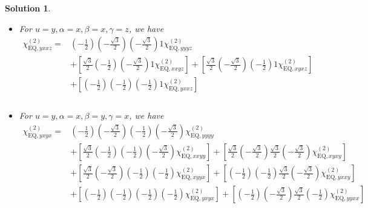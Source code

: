 \documentclass[UTF8,10pt,a4paper]{article}
\theoremstyle{Problem}
\theoremstyle{Solution}
\newtheorem*{sol}{Solution}
\begin{document}
\begin{sol}
\begin{itemize}
\begin{align}
\nonumber&+\left[\left(-\frac{1}{2}\right)\left(-\frac{1}{2}\right)\left(-\frac{\sqrt{3}}{2}\right)\frac{\sqrt{3}}{2}\chi_{\text{EQ},yxyx}^{(2)}\right]+\left[\left(-\frac{1}{2}\right)\left(-\frac{\sqrt{3}}{2}\right)\left(-\frac{1}{2}\right)\frac{\sqrt{3}}{2}\chi_{\text{EQ},yyxx}^{(2)}\right]\\
&+\left[\frac{\sqrt{3}}{2}\left(-\frac{1}{2}\right)\left(-\frac{1}{2}\right)\frac{\sqrt{3}}{2}\chi_{\text{EQ},xxxx}^{(2)}\right]
\end{align}\normalsize
\item For $u=y,\alpha=x,\beta=x,\gamma=z$, we have
\footnotesize\begin{align}
\nonumber\chi_{\text{EQ},yxxz}^{(2)}=&\left(-\frac{1}{2}\right)\left(-\frac{\sqrt{3}}{2}\right)\left(-\frac{\sqrt{3}}{2}\right)1\chi_{\text{EQ},yyyz}^{(2)}\\
\nonumber&+\left[\frac{\sqrt{3}}{2}\left(-\frac{1}{2}\right)\left(-\frac{\sqrt{3}}{2}\right)1\chi_{\text{EQ},xxyz}^{(2)}\right]+\left[\frac{\sqrt{3}}{2}\left(-\frac{\sqrt{3}}{2}\right)\left(-\frac{1}{2}\right)1\chi_{\text{EQ},xyxz}^{(2)}\right]\\
\nonumber&+\left[\left(-\frac{1}{2}\right)\left(-\frac{1}{2}\right)\left(-\frac{1}{2}\right)1\chi_{\text{EQ},yxxz}^{(2)}\right]\\
\nonumber&\\
&
\end{align}\normalsize
\item For $u=y,\alpha=x,\beta=y,\gamma=x$, we have
\footnotesize\begin{align}
\nonumber\chi_{\text{EQ},yxyx}^{(2)}=&\left(-\frac{1}{2}\right)\left(-\frac{\sqrt{3}}{2}\right)\left(-\frac{1}{2}\right)\left(-\frac{\sqrt{3}}{2}\right)\chi_{\text{EQ},yyyy}^{(2)}\\
\nonumber&+\left[\frac{\sqrt{3}}{2}\left(-\frac{1}{2}\right)\left(-\frac{1}{2}\right)\left(-\frac{\sqrt{3}}{2}\right)\chi_{\text{EQ},xxyy}^{(2)}\right]+\left[\frac{\sqrt{3}}{2}\left(-\frac{\sqrt{3}}{2}\right)\frac{\sqrt{3}}{2}\left(-\frac{\sqrt{3}}{2}\right)\chi_{\text{EQ},xyxy}^{(2)}\right]\\
\nonumber&+\left[\frac{\sqrt{3}}{2}\left(-\frac{\sqrt{3}}{2}\right)\left(-\frac{1}{2}\right)\left(-\frac{1}{2}\right)\chi_{\text{EQ},xyyx}^{(2)}\right]+\left[\left(-\frac{1}{2}\right)\left(-\frac{1}{2}\right)\frac{\sqrt{3}}{2}\left(-\frac{\sqrt{3}}{2}\right)\chi_{\text{EQ},yxxy}^{(2)}\right]\\
\nonumber&+\left[\left(-\frac{1}{2}\right)\left(-\frac{1}{2}\right)\left(-\frac{1}{2}\right)\left(-\frac{1}{2}\right)\chi_{\text{EQ},yxyx}^{(2)}\right]+\left[\left(-\frac{1}{2}\right)\left(-\frac{\sqrt{3}}{2}\right)\frac{\sqrt{3}}{2}\left(-\frac{1}{2}\right)\chi_{\text{EQ},yyxx}^{(2)}\right]\\

\end{align}
\end{itemize}
\end{sol}
\end{document}
